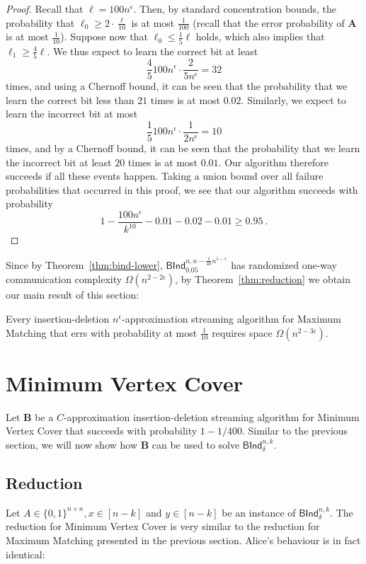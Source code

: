 \begin{proof}
 Recall that $\ell = 100 n^\epsilon$. Then, by standard concentration bounds, the probability that 
 $\ell_0 \ge 2 \cdot \frac{\ell}{10}$ is at most $\frac{1}{100}$ (recall that the error probability of $\mathbf{A}$ 
 is at most $\frac{1}{10}$). Suppose now that $\ell_0 \le \frac{1}{5} \ell$ holds, which also implies that $\ell_1 \ge \frac{4}{5} \ell$.
 We thus expect to learn the correct bit at least 
 $$\frac{4}{5} 100 n^{\epsilon} \cdot \frac{2}{5 n^\epsilon} = 32$$
 times, and using a Chernoff bound, it can be seen that the probability that we learn the correct bit less than 
 $21$ times is at most $0.02$. 
 Similarly, we expect to learn the incorrect bit at most 
 $$\frac{1}{5} 100 n^{\epsilon} \cdot \frac{1}{2n^\epsilon} = 10$$
 times, and by a Chernoff bound, it can be seen that the probability that we learn the incorrect bit at least $20$ times 
 is at most $ 0.01$. Our algorithm therefore succeeds if all these events happen. Taking a union bound
 over all failure probabilities that occurred in this proof, we see that our algorithm succeeds with probability
 $$1 - \frac{100n^{\epsilon}}{k^{10}} - 0.01 - 0.02 - 0.01 \ge 0.95 \ .$$
\end{proof}

Since by Theorem~\ref{thm:bind-lower}, $\textsf{BInd}^{n,n - \frac{1}{40} n^{1-\epsilon}}_{0.05}$ has randomized one-way 
communication complexity $\Omega(n^{2-2\epsilon})$, by Theorem~\ref{thm:reduction} we obtain our main result of this section:
%
\begin{corollary}
 Every insertion-deletion $n^\epsilon$-approximation streaming algorithm  
 for \textsf{Maximum Matching} that errs with probability at most $\frac{1}{10}$ requires space $\Omega(n^{2-3\epsilon})$.
\end{corollary}




\section{Minimum Vertex Cover} \label{sec:vertex-cover}
Let $\mathbf{B}$ be a $C$-approximation insertion-deletion streaming algorithm for \textsf{Minimum Vertex Cover} that succeeds with
probability $1 - 1/400$. Similar to the previous section, we will now show how $\mathbf{B}$ can be used to solve $\textsf{BInd}^{n,k}_{\delta}$.

\subsection{Reduction}
Let $A \in \{0, 1\}^{n \times n}, x \in [n-k]$ and  $y \in [n-k]$ be an instance of $\textsf{BInd}^{n,k}_{\delta}$. 
The reduction for \textsf{Minimum Vertex Cover} is very similar to the reduction for \textsf{Maximum Matching} presented 
in the previous section. Alice's behaviour is in fact identical: 

